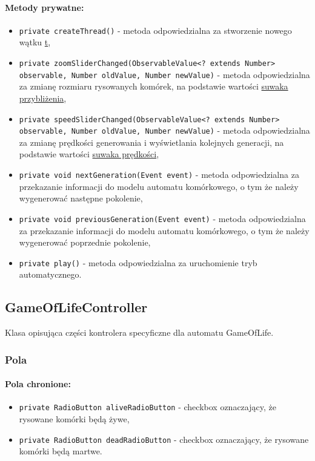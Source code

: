 \documentclass{report}
\begin{document}
\paragraph{Metody prywatne:}
\begin{itemize}
 	\item \texttt{private createThread()} - metoda odpowiedzialna za stworzenie nowego wątku \hyperref[sec:thread]{t},
 	\item \texttt{private zoomSliderChanged(ObservableValue<? extends Number> observable, Number oldValue, Number newValue)} - metoda odpowiedzialna za zmianę rozmiaru rysowanych komórek, na podstawie wartości \hyperref[sec:zoomSlider]{suwaka przybliżenia},
 	\item \texttt{private speedSliderChanged(ObservableValue<? extends Number> observable, Number oldValue, Number newValue)} - metoda odpowiedzialna za zmianę prędkości generowania i wyświetlania kolejnych generacji, na podstawie wartości \hyperref[sec:speedSlider]{suwaka prędkości},
 	\item \texttt{private void nextGeneration(Event event)} - metoda odpowiedzialna za przekazanie informacji do modelu automatu komórkowego, o tym że należy wygenerować następne pokolenie,
 	\item \texttt{private void previousGeneration(Event event)} - metoda odpowiedzialna za przekazanie informacji do modelu automatu komórkowego, o tym że należy wygenerować poprzednie pokolenie,
 	\item \texttt{private play()} - metoda odpowiedzialna za uruchomienie tryb automatycznego.
\end{itemize}

\subsection{GameOfLifeController}
Klasa opisująca części kontrolera specyficzne dla automatu GameOfLife.
\subsubsection{Pola}
\paragraph{Pola chronione:}
\begin{itemize}	\label{sec:checkbox}
	\item \texttt{private RadioButton aliveRadioButton} - checkbox oznaczający, że rysowane komórki będą żywe,
	\item \texttt{private RadioButton deadRadioButton} - checkbox oznaczający, że rysowane komórki będą martwe.
\end{itemize}
\end{document}
